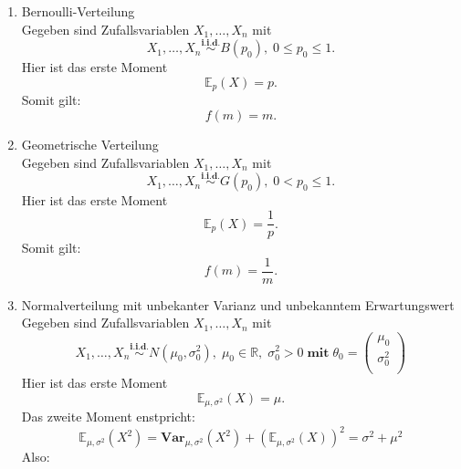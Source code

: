 \documentclass[10pt]{article}
\newcommand{\FZV}{X_1, \ldots, X_n} %
\newcommand{\IR}{\mathbb{R}} %
\newcommand{\EW}{\mathbb{E}} %
\begin{document}
	\begin{enumerate}[label = (\roman*)]
	\item Bernoulli-Verteilung \\
	Gegeben sind Zufallsvariablen $\FZV$ mit
	\begin{equation*}
		\FZV \overset{\textbf{i.i.d.}}{\sim} B(p_0), \; 0 \leq p_0 \leq 1.
	\end{equation*} 
	Hier ist das erste Moment
	\begin{equation*}
		\EW_p(X)=p.
	\end{equation*}
	Somit gilt:
	\begin{equation*}
		f(m)=m.
	\end{equation*}
	
	\item Geometrische Verteilung \\
	Gegeben sind Zufallsvariablen $\FZV$ mit
	\begin{equation*}
		\FZV \overset{\textbf{i.i.d.}}{\sim} G(p_0), \; 0 < p_0 \leq 1.
	\end{equation*} 
	Hier ist das erste Moment
	\begin{equation*}
		\EW_p(X) = \frac{1}{p}.
	\end{equation*}
	Somit gilt:
	\begin{equation*}
		f(m)=\frac{1}{m}.
	\end{equation*}
	
	
		\item Normalverteilung mit unbekanter Varianz und unbekanntem Erwartungswert\\
		Gegeben sind Zufallsvariablen $\FZV$ mit
		\begin{equation*}
			\FZV \overset{\textbf{i.i.d.}} {\sim} N(\mu_0,\sigma_0^2),\; \mu_0 \in \IR, \; \sigma_0^2 >0 \; \textbf{mit} \; \theta_0 = \left(
			\begin{array}{c}
				\mu_0\\
				\sigma_0^2\\
			\end{array}
			\right)
		\end{equation*} 
		Hier ist das erste Moment
		\begin{equation*}
			\EW_{\mu,\sigma^2}(X)=\mu.
		\end{equation*}
		Das zweite Moment enstpricht: 
		\begin{equation*}
			\EW_{\mu,\sigma^2}(X^2)=\textbf{Var}_{\mu,\sigma^2}(X^2) + (\EW_{\mu,\sigma^2}(X))^2 = \sigma^2 + \mu^2
		\end{equation*}
		Also:
		

\end{enumerate}
\end{document}
